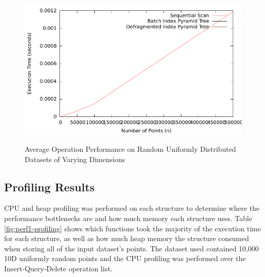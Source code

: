 \begin{figure}
\begin{center}
			\begin{subfloat} {%
				\includegraphics[scale=0.5]{figures/performance_analysis/iteration_1/all_pquery_sizevary_average.pdf}
			}
			\end{subfloat}  
		\end{center}

		\caption{Average Operation Performance on Random Uniformly Distributed Datasets of Varying Dimensions}

		\label{fig:perf1-size}
\end{figure}

\subsection{Profiling Results}

CPU and heap profiling was performed on each structure to determine where the performance bottlenecks are and how much memory each structure uses. Table \ref{fig:perf1-profiling} shows which functions took the majority of the execution time for each structure, as well as how much heap memory the structure consumed when storing all of the input dataset's points. The dataset used contained 10,000 10D uniformly random points and the CPU profiling was performed over the Insert-Query-Delete operation list.

